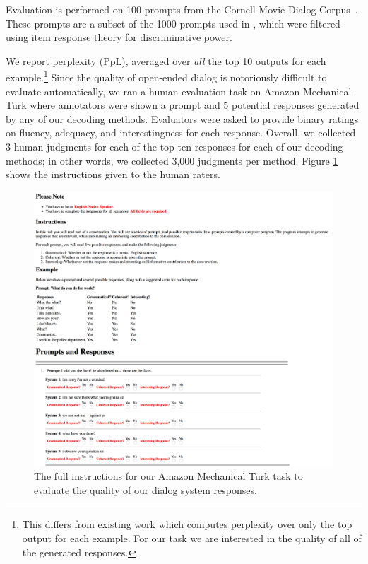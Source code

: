 Evaluation is performed on 100 prompts from the Cornell Movie Dialog Corpus~\cite{danescu2011chameleons}.
These prompts are a subset of the 1000 prompts used in \citet{baheti2018generating}, which were filtered using item response theory for discriminative power.

We report perplexity (PpL), averaged over \textit{all} the top 10 outputs for each example.\footnote{This differs from existing work which computes perplexity over only the top output for each example. For our task we are interested in the quality of all of the generated responses.} Since the quality of open-ended dialog is notoriously difficult to evaluate automatically, we ran a human evaluation task on Amazon Mechanical Turk where annotators were shown a prompt and 5 potential responses generated by any of our decoding methods.
Evaluators were asked to provide binary ratings on fluency, adequacy, and interestingness for each response. Overall, we collected 3 human judgments for each of the top ten responses for each of our decoding methods; in other words, we collected 3,000 judgments per method.
Figure \ref{figure:mturk_example} shows the instructions given to the human raters.

\begin{figure}
    \includegraphics[width=15cm]{figures/dediv_mturk_example}
    \caption{The full instructions for our Amazon Mechanical Turk task to evaluate the quality of our dialog system responses.}
    \label{figure:mturk_example}
\end{figure}

